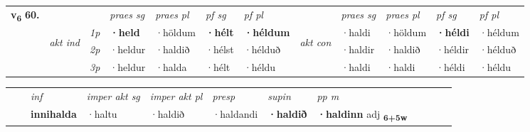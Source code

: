 \begin{tabular}{llllllllllll} \toprule
\multirow{4}{*}{{{\textbf{v{\textsubscript{6}}} \Large{\textbf{60.}}}}}  & &   &  \textit{praes sg}  & \textit{praes pl}  &\textit{ pf sg} & \textit{pf pl} &  &  \textit{praes sg}  & \textit{praes pl}  & \textit{pf sg} & \textit{pf pl } \\*
	\cmidrule{4-7} \cmidrule{9-12}
 & \multirow{3}{*}{\begin{turn}{90}\textit{akt ind}\end{turn}} & {\textit{1p}} & \textbf{·held} & ·höldum    & \textbf{·hélt} & \textbf{·héldum} & \multirow{3}{*}{\begin{turn}{90}\textit{akt con}\end{turn}} &·haldi & ·höldum & \textbf{·héldi} & ·héldum\\*
& &  {\textit{2p}} &  ·heldur  & ·haldið   & ·hélst & ·hélduð & & ·haldir & ·haldið & ·héldir & ·hélduð \\*
& &  {\textit{3p}} & ·heldur & ·halda   & ·hélt & ·héldu & & ·haldi & ·haldi& ·héldi & ·héldu  \\*
\cmidrule{4-7} \cmidrule{9-12}
\end{tabular}


\begin{tabular}{llllllllllll}
 & & \textit{inf} & \textit{imper akt sg} & \textit{imper akt pl}   & \textit{presp} & \textit{supin}  & \textit{pp m}     \\*
  & & \textbf{innihalda} & ·haltu  & ·haldið   & ·haldandi &  \textbf{·haldið}  & \textbf{·haldinn} adj \textbf{\textsubscript{6+5w}} \\*
\cmidrule{1-12}
\end{tabular}



